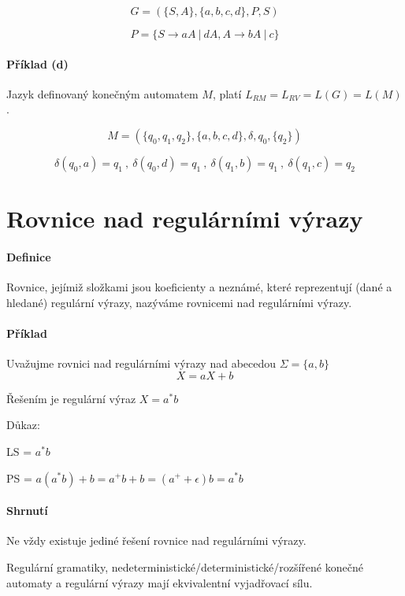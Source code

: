 $$ G = ( \{ S, A \}, \{ a, b, c, d \}, P, S ) $$

$$ P = \{ S \rightarrow aA ~|~ dA, A \rightarrow  bA ~|~ c \} $$

\paragraph*{Příklad (d)} Jazyk definovaný konečným automatem $M$, platí $L_{RM} = L_{RV} = L(G) = L(M)$.

$$ M = ( \{ q_0, q_1, q_2 \}, \{ a, b, c, d \}, \delta, q_0, \{ q_2 \} ) $$

$$ \delta(q_0, a) = q_1 ~,~ \delta(q_0, d) = q_1 ~,~ \delta(q_1, b) = q_1 ~,~ \delta(q_1, c) = q_2 $$


\section{Rovnice nad regulárními výrazy}

\paragraph*{Definice} Rovnice, jejímiž složkami jsou koeficienty a neznámé, které reprezentují (dané a hledané) regulární výrazy, nazýváme rovnicemi nad regulárními výrazy.

\paragraph*{Příklad} Uvažujme rovnici nad regulárními výrazy nad abecedou $\Sigma = \{ a, b \}$
$$ X = aX + b $$

\begin{compactitem}
    \item Řešením je regulární výraz $X = a^* b$
    \item Důkaz: \begin{compactitem}
        \item LS = $ a^* b $
        \item PS = $ a (a^* b) + b = a^+ b + b = (a^+ + \epsilon) b = a^* b $
    \end{compactitem}
\end{compactitem}

\paragraph*{Shrnutí} \begin{compactitem}
    \item Ne vždy existuje jediné řešení rovnice nad regulárními výrazy.
    \item Regulární gramatiky, nedeterministické/deterministické/rozšířené konečné automaty a regulární výrazy mají ekvivalentní vyjadřovací sílu.
\end{compactitem}
